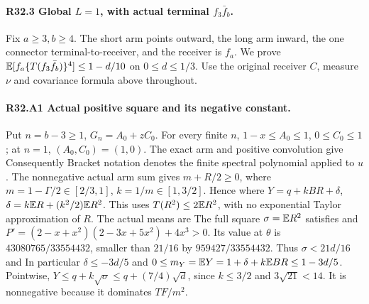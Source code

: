 \paragraph{R32.3 Global \(L=1\), with actual terminal \(f_3\bar f_b\).}
Fix \(a\ge3,\allowbreak b\ge4\). The short arm points outward, the long arm inward,
the one connector terminal-to-receiver, and the receiver is \(f_a\).
We prove \(\mathbb E[f_a\{T(f_3\bar f_b)\}^4]\le1-d/10\) on \(0\le d\le1/3\).
Use the original receiver \(C\), measure \(\nu\) and covariance formula
above throughout.

\paragraph{R32.A1 Actual positive square and its negative constant.}
Put \(n=b-3\ge1\), \(G_n=A_0+zC_0\). For every finite \(n\),
\(1-x\le A_0\le1\), \(0\le C_0\le1\); at \(n=1\), \((A_0,\allowbreak C_0)=(1,\allowbreak 0)\).
The exact arm and positive convolution give
Consequently
Bracket notation denotes the finite spectral polynomial applied to \(u\).
The nonnegative actual arm sum gives \(m+R/2\ge0\), where
\(m=1-\Gamma/2\in[2/3,\allowbreak 1]\), \(k=1/m\in[1,\allowbreak 3/2]\). Hence
where \(Y=q+kBR+\delta\), \(\delta=k\mathbb E R+(k^2/2)\mathbb E R^2\).
This uses \(T(R^2)\le2\mathbb E R^2\), with no exponential Taylor approximation
of \(R\). The actual means are
The full square \(\sigma=\mathbb E R^2\) satisfies
and \(P'=(2-x+x^2)(2-3x+5x^2)+4x^3>0\). Its value at \(\theta\) is
\(43080765/33554432\), smaller than \(21/16\) by \(959427/33554432\).
Thus \(\sigma<21d/16\) and
In particular \(\delta\le-3d/5\) and
\(0\le m_Y=\mathbb E Y=1+\delta+k\mathbb E BR\le1-3d/5\).
Pointwise,
\(Y\le q+k\sqrt\sigma\le q+(7/4)\sqrt d\), since \(k\le3/2\) and
\(3\sqrt{21}<14\). It is nonnegative because it dominates \(TF/m^2\).

